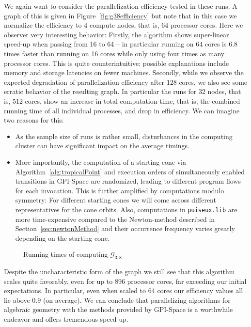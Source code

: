 \documentclass[
  paper=a4,
  titlepage,
  bibliography=totoc,
  pagesize=pdftex
]{scrartcl}
\numberwithin{figure}{section}
\numberwithin{equation}{section}
\numberwithin{table}{section}
\theoremstyle{definition}
\numberwithin{definition}{section}
\begin{document}
We again want to consider the parallelization efficiency tested in these runs. A graph of
this is given in Figure~\ref{fig:g38efficiency} but note that in this case we normalize
the efficiency to 4 compute nodes, that is, 64 processor cores. Here we observer very
interesting behavior: Firstly, the algorithm shows super-linear speed-up when passing from
16 to 64 -- in particular running on 64 cores is 6.8 times faster than running on 16 cores
while only using four times as many processor cores. This is quite counterintuitive:
possible explanations include memory and storage latencies on fewer machines.
Secondly, while we observe the expected degradation of parallelization efficiency after
128 cores, we also see some erratic behavior of the resulting graph. In particular the
runs for 32 nodes, that is, 512 cores, show an increase in total computation time, that
is, the combined running time of all individual processes, and drop in efficiency. We can
imagine two reasons for this:
\begin{itemize}
  \item As the sample size of runs is rather small, disturbances in the computing cluster
    can have significant impact on the average timings.
  \item More importantly, the computation of a starting cone via
    Algorithm~\ref{alg:tropicalPoint} and execution orders of simultaneously enabled
    transitions in GPI-Space are randomized, leading to different program flows for each
    invocation. This is further amplified by computations modulo symmetry: For different
    starting cones we will come across different representatives for the cone orbits.
    Also, computations in \texttt{puiseux.lib} are more time-expensive compared to the
    Newton-method described in Section~\ref{sec:newtonMethod} and their occurrence
    frequency varies greatly depending on the starting cone.
\end{itemize}

\begin{figure}[htbp]
  \begin{center}
    
  \end{center}
  \caption{Running times of computing $\mathcal{G}_{3,8}$}
  \label{fig:g38scaling}
\end{figure}

Despite the uncharacteristic form of the graph we still see that this algorithm scales
quite favorably, even for up to 896 processor cores, far exceeding our initial
expectations. In particular, even when scaled to 64 cores our efficiency values all lie
above $0{.}9$ (on average). We can conclude that parallelizing algorithms for algebraic
geometry with the methods provided by GPI-Space is a worthwhile endeavor and offers
tremendous speed-up.

\clearpage
\printbibliography
\end{document}
